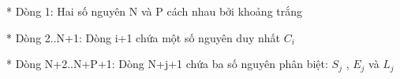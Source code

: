 * Dòng 1: Hai số nguyên N và P cách nhau bởi khoảng trắng  

   * Dòng 2..N+1: Dòng i+1 chứa một số nguyên duy nhất $C_{i}$

   * Dòng N+2..N+P+1: Dòng N+j+1 chứa ba số nguyên phân biệt: $S_{j}$   , $E_{j}$   và $L_{j}$